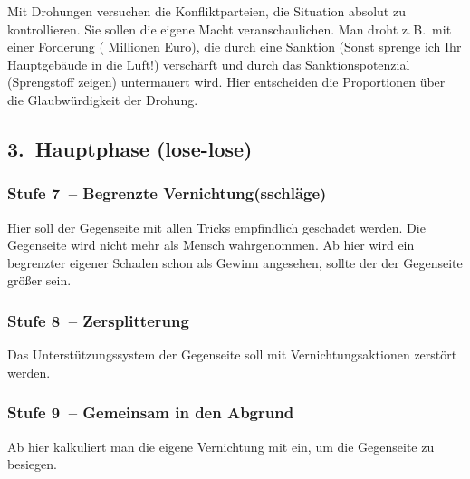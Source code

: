 Mit Drohungen versuchen die Konfliktparteien, die Situation absolut zu kontrollieren. Sie sollen die eigene Macht veranschaulichen. Man droht z.\,B.~mit einer Forderung ( Millionen Euro\grqq), die durch eine Sanktion (\glqq Sonst sprenge ich Ihr Hauptgebäude in die Luft!\grqq) verschärft und durch das Sanktionspotenzial (Sprengstoff zeigen) untermauert wird. Hier entscheiden die Proportionen über die Glaubwürdigkeit der Drohung.

\subsection{3.~Hauptphase (lose-lose)}

\subsubsection{Stufe 7~-- Begrenzte Vernichtung(sschläge)}

Hier soll der Gegenseite mit allen Tricks empfindlich geschadet werden. Die Gegenseite wird nicht mehr als Mensch wahrgenommen. Ab hier wird ein begrenzter eigener Schaden schon als Gewinn angesehen, sollte der der Gegenseite größer sein.

\subsubsection{Stufe 8~-- Zersplitterung}

Das Unterstützungssystem der Gegenseite soll mit Vernichtungsaktionen zerstört werden.

\subsubsection{Stufe 9~-- Gemeinsam in den Abgrund}

Ab hier kalkuliert man die eigene Vernichtung mit ein, um die Gegenseite zu besiegen.
